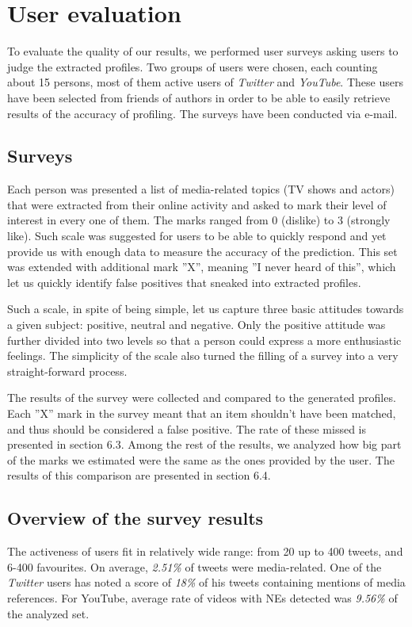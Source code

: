 \section{User evaluation}
\label{sec:evaluation}

To evaluate the quality of our results, we performed user surveys
asking users to judge the extracted profiles. Two groups of users were chosen,
each counting about 15 persons, most of them active users of \textit{Twitter} and \textit{YouTube}.
These users have been selected from friends of authors in order to be able to easily
retrieve results of the accuracy of profiling. The surveys have been conducted via
e-mail.

\subsection{Surveys}

Each person was presented a list of media-related topics (TV shows and actors) 
that were extracted from their online
activity and asked to mark their level of interest in every one of
them. The marks ranged from 0 (dislike) to 3 (strongly like).
Such scale was suggested for users to be able to quickly respond
and yet provide us with enough data to measure the accuracy of the prediction.
This set was extended with additional mark ''X'', meaning
''I never heard of this'', which let us quickly identify false positives that
sneaked into extracted profiles.

Such a scale, in spite of being simple, let us capture three basic attitudes
towards a given subject: positive, neutral and negative. Only the positive
attitude was further divided into two levels so that a person could express a
more enthusiastic feelings. The simplicity of the scale also turned the filling
of a survey into a very straight-forward process.

The results of the survey were collected and compared to the generated profiles.
Each ''X'' mark in the survey meant that an item shouldn't have been matched,
and thus should be considered a false positive. The rate of these missed is
presented in section 6.3. Among the rest of the results, we analyzed how big
part of the marks we estimated were the same as the ones provided by the user.
The results of this comparison are presented in section 6.4.

\subsection{Overview of the survey results}
The activeness of users fit in relatively wide range: from 20 up to 400 tweets,
and 6-400 favourites. On average, \textit{2.51\%} of tweets were media-related.
One of the \textit{Twitter} users has noted a score of \textit{18\%} of his
tweets containing mentions of media references. For YouTube, average rate of
videos with NEs detected was \textit{9.56\%} of the analyzed set.

